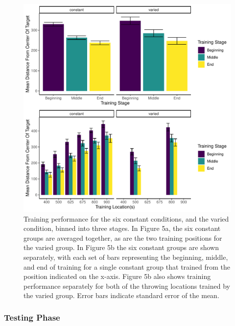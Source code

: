 \documentclass[
  jou, donotrepeattitle,floatsintext]{apa7}
\begin{document}
\begin{figure}
\centering
\includegraphics{IGAS_PJ_files/figure-latex/e2train-1.pdf}
\caption{\label{fig:e2train}Training performance for the six constant conditions, and the varied condition, binned into three stages. In Figure 5a, the six constant groups are averaged together, as are the two training positions for the varied group. In Figure 5b the six constant groups are shown separately, with each set of bars representing the beginning, middle, and end of training for a single constant group that trained from the position indicated on the x-axis. Figure 5b also shows training performance separately for both of the throwing locations trained by the varied group. Error bars indicate standard error of the mean.}
\end{figure}

\hypertarget{testing-phase}{%
\subsubsection{Testing Phase}\label{testing-phase}}
\end{document}
